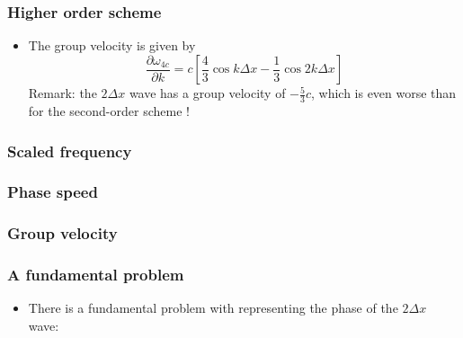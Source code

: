 \documentclass[aspectratio=43,9pt]{beamer}
\begin{document}
%
%
\begin{frame}
	\frametitle{Higher order scheme}
	\vfill\begin{itemize}
		\item The group velocity is given by
		\begin{equation*}
			\frac{\partial \omega_{4 c}}{\partial k} =c \left[ \frac43 \cos k \Delta x - \frac13 \cos 2 k \Delta x \right]
		\end{equation*}
		Remark: the $2 \Delta x$ wave has a group velocity of $-\frac53 c$, which is even worse than for the second-order scheme !
	\end{itemize}\vfill
\end{frame}
%
%
\begin{frame}
	\frametitle{Scaled frequency}
	\begin{center}
		\scalebox{.8}{}
	\end{center}
\end{frame}
%
%
\begin{frame}
	\frametitle{Phase speed}
	\begin{center}
		\scalebox{.8}{}
	\end{center}
\end{frame}
%
%
\begin{frame}
	\frametitle{Group velocity}
	\begin{center}
		\scalebox{.8}{}
	\end{center}
\end{frame}
%
%
\begin{frame}
	\frametitle{A fundamental problem}
	\vfill\begin{itemize}
		\item There is a fundamental problem with representing the phase of the $2\Delta x$ wave:
			\begin{center}%
				\only<2->{%
					\scalebox{.8}{}%
				}%
			\end{center}%
	\end{itemize}\vfill
\end{frame}
\end{document}
